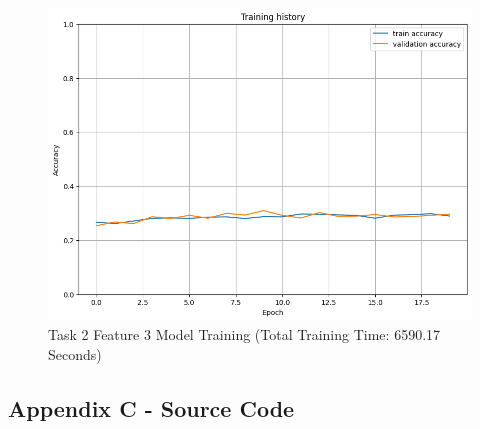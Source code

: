 \documentclass[10.7pt, onecolumn]{article}
\begin{document}
\begin{figure}[H]
  \centering
  \includegraphics[]{images/model2_task2_feature3_plot.png}
  \caption{Task 2 Feature 3 Model Training (Total Training Time: 6590.17 Seconds)}
  \label{fig:t2f3plot}
\end{figure}
\newpage
\subsection{Appendix C - Source Code}

%
%
\end{document}
